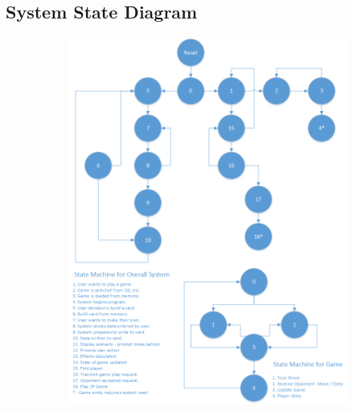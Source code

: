 \documentclass[12pt]{article} %
\begin{document}
\subsection{System State Diagram\label{fig:sysStateDiagram}}
\begin{figure}[H]
	\centering
	\begin{subfigure}{0.48\textwidth}
		\includegraphics[width=\textwidth]{images/overallSystemDiagram.png}
		\caption{}
		\label{fig:sysStates}
	\end{subfigure}
	~
	\begin{subfigure}{0.48\textwidth}

\end{subfigure}
\end{figure}
\end{document}
